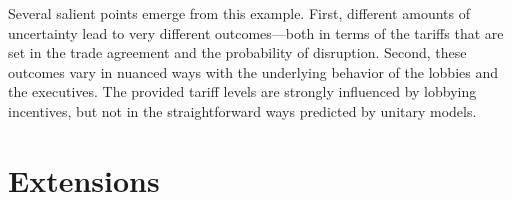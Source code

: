 \documentclass[10pt]{article}
\newtheorem{result}{Result}
\newcommand{\ve}{\theta}
\newcommand{\ga}{\gamma}
\begin{document}
Several salient points emerge from this example. First, different amounts of uncertainty lead to very different outcomes---both in terms of the tariffs that are set in the trade agreement and the probability of disruption. Second, these outcomes vary in nuanced ways with the underlying behavior of the lobbies and the executives. The provided tariff levels are strongly influenced by lobbying incentives, but not in the straightforward ways predicted by unitary models.


\section{Extensions}
\label{sec:ext}

\end{document}
